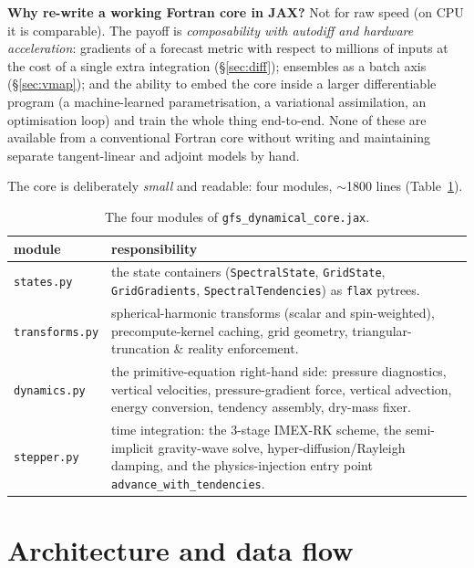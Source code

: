 \documentclass[11pt]{article}
\newcommand{\code}[1]{\texttt{#1}}
\begin{document}
\begin{keybox}
\textbf{Why re-write a working Fortran core in JAX?} Not for raw speed (on CPU it
is comparable). The payoff is \emph{composability with autodiff and hardware
acceleration}: gradients of a forecast metric with respect to millions of inputs
at the cost of a single extra integration (\S\ref{sec:diff}); ensembles as a
batch axis (\S\ref{sec:vmap}); and the ability to embed the core inside a larger
differentiable program (a machine-learned parametrisation, a variational
assimilation, an optimisation loop) and train the whole thing end-to-end. None of
these are available from a conventional Fortran core without writing and
maintaining separate tangent-linear and adjoint models by hand.
\end{keybox}

The core is deliberately \emph{small} and readable: four modules, $\sim$1800 lines
(Table~\ref{tab:modules}).

\begin{table}[h]
\centering
\caption{The four modules of \code{gfs\_dynamical\_core.jax}.}
\label{tab:modules}
\begin{tabular}{lp{10.5cm}}
\toprule
module & responsibility \\
\midrule
\code{states.py} & the state containers (\code{SpectralState}, \code{GridState},
  \code{GridGradients}, \code{SpectralTendencies}) as \code{flax} pytrees. \\
\code{transforms.py} & spherical-harmonic transforms (scalar and spin-weighted),
  precompute-kernel caching, grid geometry, triangular-truncation \& reality
  enforcement. \\
\code{dynamics.py} & the primitive-equation right-hand side: pressure diagnostics,
  vertical velocities, pressure-gradient force, vertical advection, energy
  conversion, tendency assembly, dry-mass fixer. \\
\code{stepper.py} & time integration: the 3-stage IMEX-RK scheme, the
  semi-implicit gravity-wave solve, hyper-diffusion/Rayleigh damping, and the
  physics-injection entry point \code{advance\_with\_tendencies}. \\
\bottomrule
\end{tabular}
\end{table}

\section{Architecture and data flow}\label{sec:arch}
\end{document}
